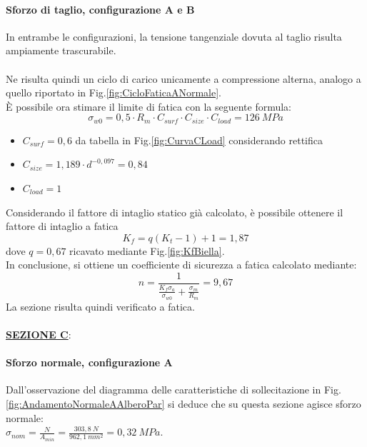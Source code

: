 \paragraph{Sforzo di taglio, configurazione A e B} In entrambe le configurazioni, la tensione tangenziale dovuta al taglio risulta ampiamente trascurabile.\\
\\
Ne risulta quindi un ciclo di carico unicamente a compressione alterna, analogo a quello riportato in Fig.\ref{fig:CicloFaticaANormale}.\\
È possibile ora stimare il limite di fatica con la seguente formula:
\begin{equation}
    \sigma_{w0}=0,5\cdot R_m\cdot C_{surf}\cdot C_{size}\cdot C_{load}=126\ MPa
\end{equation}
\begin{itemize}
    \item $C_{surf}=0,6$ da tabella in Fig.\ref{fig:CurvaCLoad} considerando rettifica 
    \item $C_{size}=1,189\cdot d^{-0,097}=0,84$
    \item $C_{load}=1$
\end{itemize}
Considerando il fattore di intaglio statico già calcolato, è possibile ottenere il fattore di intaglio a fatica
\begin{equation}
    K_f=q\left(K_t-1\right)+1=1,87
\end{equation}
dove $q=0,67$ ricavato mediante Fig.\ref{fig:KfBiella}.\\
In conclusione, si ottiene un coefficiente di sicurezza a fatica calcolato mediante:
\begin{equation}
    n=\frac{1}{\frac{K_f\sigma_a}{\sigma_{w0}}+\frac{\sigma_m}{R_m}}=9,67
\end{equation}
La sezione risulta quindi verificato a fatica. \\
\\
\underline{\textbf{SEZIONE C}}:
\paragraph{Sforzo normale, configurazione A} Dall'osservazione del diagramma delle caratteristiche di sollecitazione in Fig.\ref{fig:AndamentoNormaleAAlberoPar} si deduce che su questa sezione agisce sforzo normale:\\
$\sigma_{nom}=\frac{N}{A_{min}}=\frac{303,8\ N}{962,1\ mm^2}=0,32\ MPa$.
